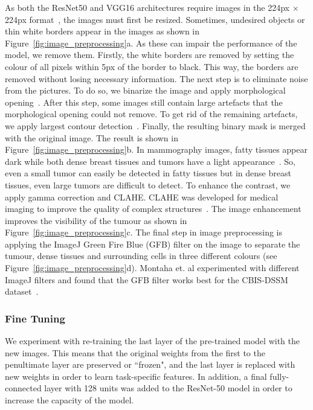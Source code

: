 \documentclass[sn-mathphys,Numbered]{sn-jnl}%
\theoremstyle{thmstyleone}%
\theoremstyle{thmstyletwo}%
\theoremstyle{thmstylethree}%
\begin{document}
\noindent As both the ResNet50 and VGG16 architectures require images in the 224px $\times$ 224px format~\cite{resnet_docu, vgg_docu}, the images must first be resized. Sometimes, undesired objects or thin white borders appear in the images as shown in Figure~\ref{fig:image_preprocessing}a. As these can impair the performance of the model, we remove them. Firstly, the white borders are removed by setting the colour of all pixels within 5px of the border to black. This way, the borders are removed without losing necessary information. The next step is to eliminate noise from the pictures. To do so, we binarize the image and apply morphological opening~\cite{morph}. After this step, some images still contain large artefacts that the morphological opening could not remove. To get rid of the remaining artefacts, we apply largest contour detection~\cite{contours}. Finally, the resulting binary mask is merged with the original image. The result is shown in Figure~\ref{fig:image_preprocessing}b. In mammography images, fatty tissues appear dark while both dense breast tissues and tumors have a light appearance~\cite{Montaha2021}. So, even a small tumor can easily be detected in fatty tissues but in dense breast tissues, even large tumors are difficult to detect. To enhance the contrast, we apply gamma correction and CLAHE. CLAHE was developed for medical imaging to improve the quality of complex structures~\cite{Montaha2021}. The image enhancement improves the visibility of the tumour as shown in Figure~\ref{fig:image_preprocessing}c. The final step in image preprocessing is applying the ImageJ Green Fire Blue (GFB) filter on the image to separate the tumour, dense tissues and surrounding cells in three different colours (see Figure~\ref{fig:image_preprocessing}d). Montaha et. al experimented with different ImageJ filters and found that the GFB filter works best for the CBIS-DSSM dataset~\cite{Montaha2021}.
\subsubsection{Fine Tuning}
\label{finetuning}
We experiment with re-training the last layer of the pre-trained model with the new images. This means that the original weights from the first to the penultimate layer are preserved or ``frozen", and the last layer is replaced with new weights in order to learn task-specific features. In addition, a final fully-connected layer with 128 units was added to the ResNet-50 model in order to increase the capacity of the model.
\end{document}
